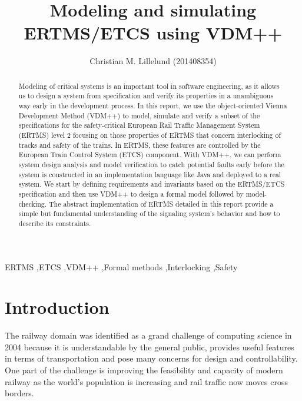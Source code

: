 \documentclass[preprint,12pt]{elsarticle}
\begin{document}
\begin{frontmatter}

\title{Modeling and simulating ERTMS/ETCS using VDM++}


\author{Christian M. Lillelund (201408354)}

\address{School of Engineering, Aarhus University}

\address{Course: E18 - Modeling of Critical Systems}

\begin{abstract}
Modeling of critical systems is an important tool in software engineering, as it allows us to design a system
from specification and verify its properties in a unambiguous way early in the development process. In this report, we use the object-oriented Vienna Development Method (VDM++) to model, simulate and verify a subset of the specifications for the safety-critical European Rail Traffic Management System (ERTMS) level 2 focusing on those properties of ERTMS that concern interlocking of tracks and safety of the trains. In ERTMS, these features are controlled by the European Train Control System (ETCS) component. With VDM++, we can perform system design analysis and model verification to catch potential faults early before the system is constructed in an implementation language like Java and deployed to a real system. We start by defining requirements and invariants based on the ERTMS/ETCS specification and then use VDM++ to design a formal model followed by model-checking. The abstract implementation of ERTMS detailed in this report provide a simple but fundamental understanding of the signaling system's behavior and how to describe its constraints.
\end{abstract}

\begin{keyword}
ERTMS \sep ETCS \sep VDM++ \sep Formal methods \sep Interlocking \sep Safety
\end{keyword}

\end{frontmatter}

\section{Introduction}
\label{S:introduction}
The railway domain was identified as a grand challenge of computing science in 2004 because it is understandable by the general public, provides useful features in terms of transportation and pose many concerns for design and controllability. One part of the challenge is improving the feasibility and capacity of modern railway as the world's population is increasing and rail traffic now moves cross borders.
\end{document}
